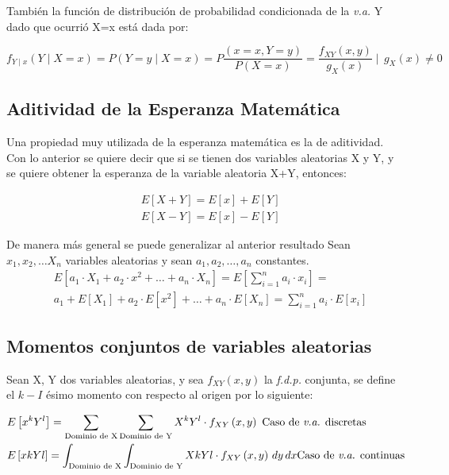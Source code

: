 También la función de distribución de probabilidad condicionada de la \textit{v.a.} Y dado que ocurrió X=x está dada por:

\begin{equation*}
    f_{Y \mid x}\left( Y \mid X=x\right) =P\left(Y=y \mid X=x \right) =P\frac{\left(x=x ,Y= y \right)}{P\left( X=x \right)}=\frac{f_{XY}  \left(x,y\right)}{g_X\left( x \right)}\mid\, g_X \left(x\right) \neq 0
\end{equation*}

\subsection{Aditividad de la Esperanza Matemática}

Una propiedad muy utilizada de la esperanza matemática es la de
aditividad. Con lo anterior se quiere decir que si se tienen dos
variables aleatorias X y Y, y se quiere obtener la esperanza de la
variable aleatoria X+Y, entonces:

\begin{align}
     & E\left[ X+Y\right]=E\left[ x\right]+E\left[ Y\right]    \\
     & E\left[ X - Y\right]=E\left[ x\right]- E\left[ Y\right]
\end{align}

De manera más general se puede generalizar al anterior resultado
Sean $x_1,x_2,\dots X_n$ variables aleatorias y sean $a_1,a_2,\dots ,a_n$ constantes.
\begin{align*}
    &E\left[ a_1\cdot X_1+a_2\cdot x^2+\dots +a_n\cdot X_n\right]=E\left[\sum_{i=1}^n a_i\cdot x_i\right]=\\
    &a_1+ E\left[X_1\right]+a_2\cdot E\left[x^2\right]+\dots +a_n\cdot E\left[X_n\right]=\sum_{i=1}^n a_i\cdot E\left[x_i\right]
\end{align*}

\subsection{Momentos conjuntos de variables aleatorias}

Sean X, Y dos variables aleatorias, y sea $f_{XY}\left( x,y\right)$  la \textit{f.d.p.} conjunta, se define el $k-I$ ésimo momento con respecto al origen por lo siguiente:

\begin{align*}
     & E\left[ x^kY^l\right]= \sum_{\text{Dominio de X}}\sum_{\text{Dominio de Y}}X^kY^l\cdot f_{XY}  \left(x,y\right)  \text{ Caso de \textit{v.a.} discretas}       \\
     & E\left[ xkYl\right]= \int_{\text{Dominio de X}}\int_{\text{Dominio de Y}}XkYl\cdot f_{XY}  \left( x , y\right) \,dy\,dx \text{Caso de \textit{v.a.} continuas}
\end{align*}

